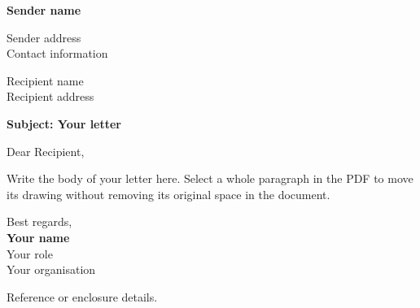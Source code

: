 \documentclass[11pt]{article}
\begin{document}
{\fontsize{14}{17}\selectfont\textbf{Sender name}}\par
Sender address\\
Contact information

\vspace{6mm}
Recipient name\\
Recipient address

\vspace{5mm}
\textbf{Subject: Your letter}

Dear Recipient,

Write the body of your letter here. Select a whole paragraph in the PDF to move
its drawing without removing its original space in the document.

\vspace{5mm}
\noindent\begin{minipage}{\linewidth}
Best regards,\\[4mm]
\textbf{Your name}\\[2pt]
Your role\\[2pt]
Your organisation
\end{minipage}

\vspace{25mm}
Reference or enclosure details.
\end{document}
